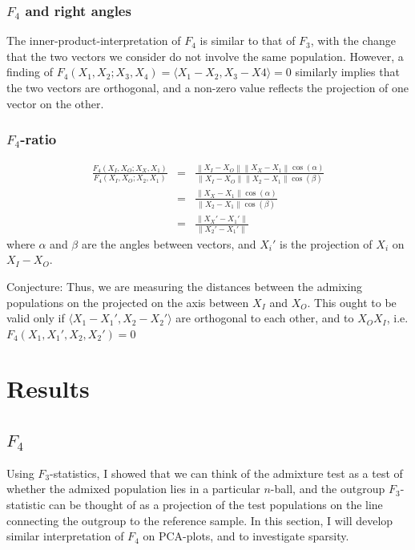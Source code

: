 \documentclass[12pt,a4pape, fullpage]{article}
\newcommand{\norm}[1]{\left\lVert#1\right\rVert}
\begin{document}
\subsubsection{$F_4$ and right angles}
The inner-product-interpretation of $F_4$ is similar to that of $F_3$, with the change that the two vectors we consider do not involve the same population. However, a finding of $F_4(X_1, X_2; X_3, X_4) = \langle X_1 - X_2, X_3 - X4 \rangle = 0$ similarly implies that the two vectors are orthogonal, and a non-zero value reflects the projection of one vector on the other.

\subsubsection{$F_4$-ratio}
\begin{eqnarray}
\frac{F_4(X_I, X_O; X_X, X_1)}{F_4(X_I, X_O; X_2, X_1)} &=& \frac{\norm{X_I-X_O}\norm{X_X-X_1}\cos(\alpha)}{\norm{X_I-X_O}\norm{X_2-X_1}\cos(\beta)}\nonumber\\
&=&\frac{\norm{X_X-X_1}\cos(\alpha)}{\norm{X_2-X_1}\cos(\beta)}\nonumber\\
&=& \frac{\norm{X_X' - X_1'}}{\norm{X_2' - X_1'}}
\end{eqnarray}
where $\alpha$ and $\beta$ are the angles between vectors, and $X_i'$ is the projection of $X_i$ on $X_I-X_O$.

Conjecture: Thus, we are measuring the distances between the admixing populations on the projected on the axis between $X_I$ and $X_O$. This ought to be valid only if $\langle X_1 - X_1', X_2 - X_2' \rangle$ are orthogonal to each other, and to $X_OX_I$, i.e.
$F_4(X_1, X_1', X_2, X_2') = 0$
 
	
\section{Results}
\subsection{$F_4$}
Using $F_3$-statistics, I showed that we can think of the admixture test as a test of whether the admixed population lies in a particular $n$-ball, and the outgroup $F_3$-statistic can be thought of as a projection of the test populations on the line connecting the outgroup to the reference sample. In this section, I will develop similar interpretation of $F_4$ on PCA-plots, and to investigate sparsity. 
\end{document}
